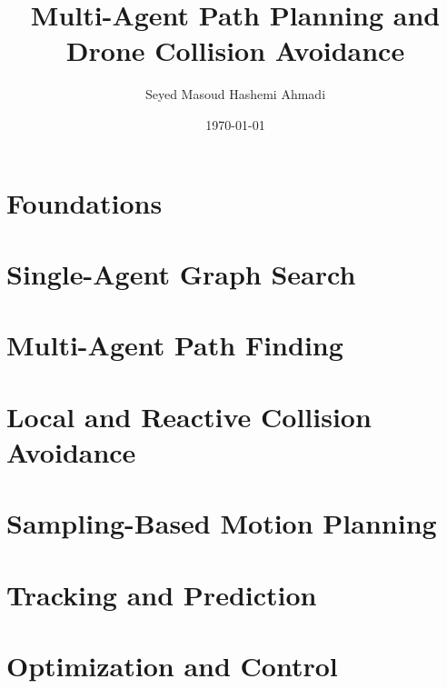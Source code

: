 \documentclass[11pt,a4paper,oneside,openany]{book}
\title{Multi-Agent Path Planning and Drone Collision Avoidance}
\author{Seyed Masoud Hashemi Ahmadi}
\date{\today}
\begin{document}
\frontmatter



\tableofcontents
\listofalgorithms



\mainmatter

\part{Foundations}



\part{Single-Agent Graph Search}





\part{Multi-Agent Path Finding}






\part{Local and Reactive Collision Avoidance}





\part{Sampling-Based Motion Planning}



\part{Tracking and Prediction}




\part{Optimization and Control}



\end{document}
